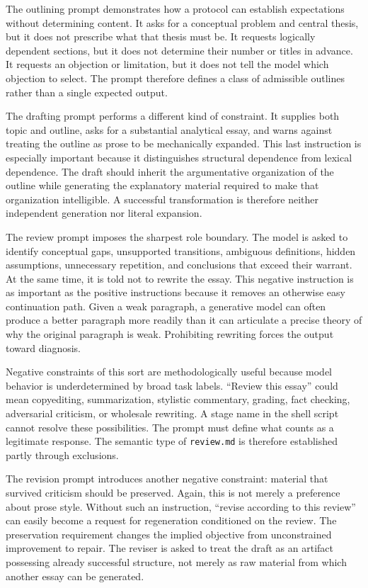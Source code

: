 \documentclass[11pt]{article}
\begin{document}
The outlining prompt demonstrates how a protocol can establish expectations without determining content. It asks for a conceptual problem and central thesis, but it does not prescribe what that thesis must be. It requests logically dependent sections, but it does not determine their number or titles in advance. It requests an objection or limitation, but it does not tell the model which objection to select. The prompt therefore defines a class of admissible outlines rather than a single expected output.

The drafting prompt performs a different kind of constraint. It supplies both topic and outline, asks for a substantial analytical essay, and warns against treating the outline as prose to be mechanically expanded. This last instruction is especially important because it distinguishes structural dependence from lexical dependence. The draft should inherit the argumentative organization of the outline while generating the explanatory material required to make that organization intelligible. A successful transformation is therefore neither independent generation nor literal expansion.

The review prompt imposes the sharpest role boundary. The model is asked to identify conceptual gaps, unsupported transitions, ambiguous definitions, hidden assumptions, unnecessary repetition, and conclusions that exceed their warrant. At the same time, it is told not to rewrite the essay. This negative instruction is as important as the positive instructions because it removes an otherwise easy continuation path. Given a weak paragraph, a generative model can often produce a better paragraph more readily than it can articulate a precise theory of why the original paragraph is weak. Prohibiting rewriting forces the output toward diagnosis.

Negative constraints of this sort are methodologically useful because model behavior is underdetermined by broad task labels. ``Review this essay'' could mean copyediting, summarization, stylistic commentary, grading, fact checking, adversarial criticism, or wholesale rewriting. A stage name in the shell script cannot resolve these possibilities. The prompt must define what counts as a legitimate response. The semantic type of \texttt{review.md} is therefore established partly through exclusions.

The revision prompt introduces another negative constraint: material that survived criticism should be preserved. Again, this is not merely a preference about prose style. Without such an instruction, ``revise according to this review'' can easily become a request for regeneration conditioned on the review. The preservation requirement changes the implied objective from unconstrained improvement to repair. The reviser is asked to treat the draft as an artifact possessing already successful structure, not merely as raw material from which another essay can be generated.
\end{document}
